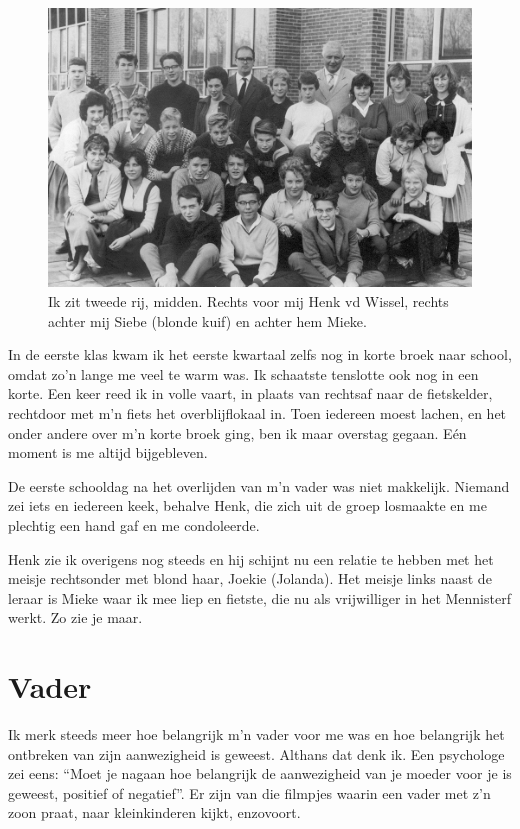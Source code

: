 \documentclass[12pt,twoside, openright]{memoir}
\begin{document}
\begin{figure}
\centering
\includegraphics[width=\textwidth]{img/ch19/ULOSchool}
\caption*{\footnotesize Ik zit tweede rij, midden. Rechts voor mij Henk vd Wissel, rechts achter mij Siebe (blonde kuif) en achter hem Mieke. }
\end{figure}

In de eerste klas kwam ik het eerste kwartaal zelfs nog in korte broek naar school, omdat zo’n lange me veel te warm was. Ik schaatste tenslotte ook nog in een korte. Een keer reed ik in volle vaart, in plaats van rechtsaf naar de fietskelder, rechtdoor met m’n fiets het overblijflokaal in. Toen iedereen moest lachen, en het onder andere over m’n korte broek ging, ben ik maar overstag gegaan. Eén moment is me altijd bijgebleven. 

De eerste schooldag na het overlijden van m’n vader was niet makkelijk. Niemand zei iets en iedereen keek, behalve Henk, die zich uit de groep losmaakte en me plechtig een hand gaf en me condoleerde. 

Henk zie ik overigens nog steeds en hij schijnt nu een relatie te hebben met het meisje rechtsonder met blond haar, Joekie (Jolanda). Het meisje links naast de leraar is Mieke waar ik mee liep en fietste, die nu als vrijwilliger in het Mennisterf werkt. Zo zie je maar.

\section*{Vader} %
\label{cha:vader}

Ik merk steeds meer hoe belangrijk m'n vader voor me was en hoe belangrijk het ontbreken van zijn aanwezigheid is geweest. Althans dat denk ik. Een psychologe zei eens: ``Moet je nagaan hoe belangrijk de aanwezigheid van je moeder voor je is geweest, positief of negatief''. Er zijn van die filmpjes waarin een vader met z'n zoon praat, naar kleinkinderen kijkt, enzovoort.
\end{document}
